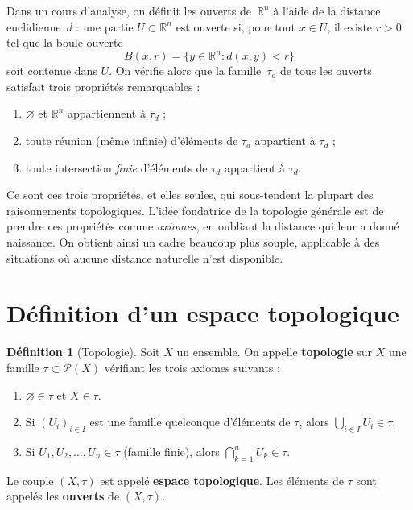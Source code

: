 \documentclass[12pt,a4paper,openany]{book}
\theoremstyle{definition}
\newtheorem{definition}{Définition}[chapter]
\theoremstyle{cours}
\theoremstyle{coursnormal}
\newcommand{\R}{\mathbb{R}}
\begin{document}
Dans un cours d'analyse, on définit les ouverts de~$\R^n$ à l'aide de la distance euclidienne~$d$ : une partie $U \subset \R^n$ est ouverte si, pour tout $x \in U$, il existe $r > 0$ tel que la boule ouverte
\[
  B(x,r) = \{y \in \R^n : d(x,y) < r\}
\]
soit contenue dans $U$. On vérifie alors que la famille~$\tau_d$ de tous les ouverts satisfait trois propriétés remarquables :
\begin{enumerate}[label=(\roman*)]
  \item $\varnothing$ et $\R^n$ appartiennent à $\tau_d$ ;
  \item toute réunion (même infinie) d'éléments de $\tau_d$ appartient à $\tau_d$ ;
  \item toute intersection \emph{finie} d'éléments de $\tau_d$ appartient à $\tau_d$.
\end{enumerate}

Ce sont ces trois propriétés, et elles seules, qui sous-tendent la plupart des raisonnements topologiques. L'idée fondatrice de la topologie générale est de prendre ces propriétés comme \emph{axiomes}, en oubliant la distance qui leur a donné naissance. On obtient ainsi un cadre beaucoup plus souple, applicable à des situations où aucune distance naturelle n'est disponible.

\section{Définition d'un espace topologique}
\label{sec:def-espace-topo}

\begin{definition}[Topologie]\label{def:topologie}
  Soit $X$ un ensemble. On appelle \textbf{topologie} sur $X$ une famille $\tau \subset \mathcal{P}(X)$ vérifiant les trois axiomes suivants :
  \begin{enumerate}[label=\textbf{(O\arabic*)}]
    \item\label{ax:O1} $\varnothing \in \tau$ et $X \in \tau$.
    \item\label{ax:O2} Si $(U_i)_{i \in I}$ est une famille quelconque d'éléments de $\tau$, alors $\displaystyle\bigcup_{i \in I} U_i \in \tau$.
    \item\label{ax:O3} Si $U_1, U_2, \ldots, U_n \in \tau$ (famille finie), alors $\displaystyle\bigcap_{k=1}^{n} U_k \in \tau$.
  \end{enumerate}
  Le couple $(X,\tau)$ est appelé \textbf{espace topologique}. Les éléments de $\tau$ sont appelés les \textbf{ouverts} de $(X,\tau)$.
\end{definition}
\end{document}
